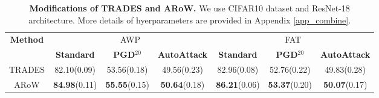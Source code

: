 \documentclass[nohyperref]{article}
\theoremstyle{plain}
\theoremstyle{definition}
\theoremstyle{remark}
\begin{document}
\begin{table}[ht]
    \caption{\textbf{Modifications of TRADES and ARoW.} We use CIFAR10 dataset and ResNet-18 architecture. More details of hyerparameters are provided in Appendix \ref{app_combine}.}
    \centering
    \begin{tabular}{c|ccc|ccc}
    \toprule
    \multirow{2}{*}{\textbf{Method}} & \multicolumn{3}{c|}{AWP}   & \multicolumn{3}{c}{FAT}  \\
    \cline{2-7}
    & \textbf{Standard}  & \textbf{PGD}$^{20}$ & \textbf{AutoAttack} & \textbf{Standard}  & \textbf{PGD}$^{20}$ & \textbf{AutoAttack} \\
    \hline
    \hline
    TRADES                & 82.10(0.09) & 53.56(0.18) & 49.56(0.23) & 82.96(0.08) & 52.76(0.22) & 49.83(0.28) \\
    ARoW                & \textbf{84.98}(0.11) &\textbf{55.55}(0.15) & \textbf{50.64}(0.18) & \textbf{86.21}(0.06) & \textbf{53.37}(0.20) & \textbf{50.07}(0.17) \\
    \bottomrule
    \end{tabular}
    \label{combination}
    \vskip -0.1in
\end{table}
\begin{table}[ht]
    \caption{\textbf{Class-wise accuracy disparity for CIFAR10}. We report the accuracy (ACC), the worst-class accuracy (WC-Acc) and the standard deviation of class-wise accuracies (SD) for each method.}
    \centering
    \label{table5}
    \vskip -0.1in
\end{table}
\end{document}
